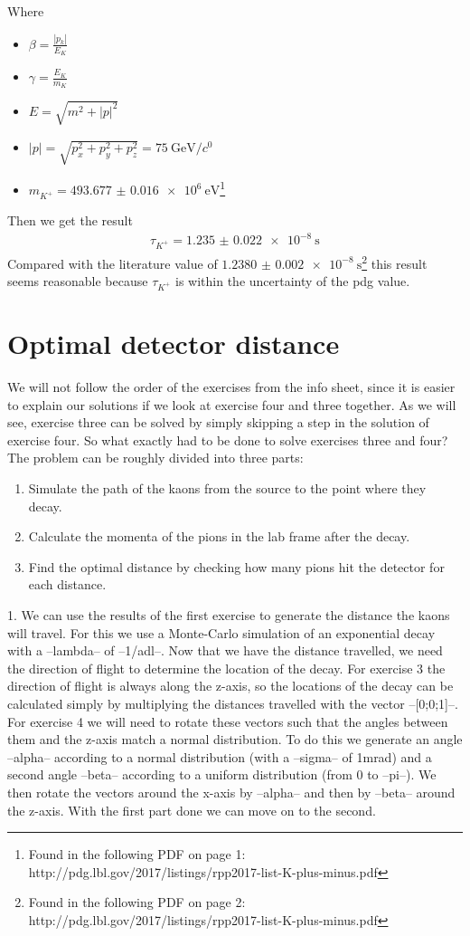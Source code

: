 \documentclass[12pt,a4paper,oneside,english]{article}
\begin{document}
Where
\begin{itemize}
	\item $\beta = \frac{|p_k|}{E_K}$
	\item $\gamma = \frac{E_K}{m_K}$
	\item $E = \sqrt{m^2 + |p|^2}$
	\item $|p| = \sqrt{p_x^2 + p_y^2 + p_z^2 } = \SI{75}{\giga\electronvolt\per\clight}$
	\item $m_{K^+} = \SI{493.677(16)e6}{\electronvolt}$\footnote{Found in the following PDF on page 1: http://pdg.lbl.gov/2017/listings/rpp2017-list-K-plus-minus.pdf}
\end{itemize}
Then we get the result
\begin{align}
	\tau_{K^+} = \SI{1.235(22)e-8}{\second}
\end{align}
Compared with the literature value of $\SI{1.2380(20)e-8}{\second}$\footnote{Found in the following PDF on page 2: http://pdg.lbl.gov/2017/listings/rpp2017-list-K-plus-minus.pdf} this result seems reasonable because $\tau_{K^+}$ is within the uncertainty of the pdg value.
\section{Optimal detector distance}
	
We will not follow the order of the exercises from the info sheet, since it is easier to explain our solutions if we look at exercise four and three together. As we will see, exercise three can be solved by simply skipping a step in the solution of exercise four. So what exactly had to be done to solve exercises three and four? The problem can be roughly divided into three parts:
\begin{enumerate}
\item Simulate the path of the kaons from the source to the point where they decay.
\item Calculate the momenta of the pions in the lab frame after the decay.
\item Find the optimal distance by checking how many pions hit the detector for each distance.
\end{enumerate}

1. We can use the results of the first exercise to generate the distance the kaons will travel. For this we use a Monte-Carlo simulation of an exponential decay with a --lambda-- of --1/adl--. Now that we have the distance travelled, we need the direction of flight to determine the location of the decay. For exercise 3 the direction of flight is always along the z-axis, so the locations of the decay can be calculated simply by multiplying the distances travelled with the vector --[0;0;1]--. For exercise 4 we will need to rotate these vectors such that the angles between them and the z-axis match a normal distribution. To do this we generate an angle --alpha-- according to a normal distribution (with a --sigma-- of 1mrad) and a second angle --beta-- according to a uniform distribution (from 0 to --pi--). We then rotate the vectors around the x-axis by --alpha-- and then by --beta-- around the z-axis.
With the first part done we can move on to the second.
	
\end{document}
